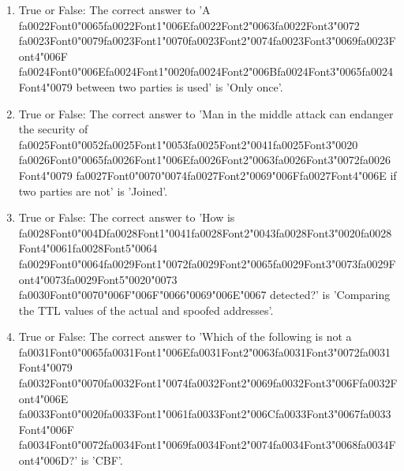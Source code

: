 \documentclass[12pt]{article}
\begin{document}
\begin{enumerate}[label=\arabic*.]
\item True or False: The correct answer to 'A {\csname fa0022Font0\endcsname\char"0065}{\csname fa0022Font1\endcsname\char"006E}{\csname fa0022Font2\endcsname\char"0063}{\csname fa0022Font3\endcsname\char"0072} {\csname fa0023Font0\endcsname\char"0079}{\csname fa0023Font1\endcsname\char"0070}{\csname fa0023Font2\endcsname\char"0074}{\csname fa0023Font3\endcsname\char"0069}{\csname fa0023Font4\endcsname\char"006F} {\csname fa0024Font0\endcsname\char"006E}{\csname fa0024Font1\endcsname\char"0020}{\csname fa0024Font2\endcsname\char"006B}{\csname fa0024Font3\endcsname\char"0065}{\csname fa0024Font4\endcsname\char"0079} between two parties is used' is 'Only once'.
\item True or False: The correct answer to 'Man in the middle attack can endanger the security of {\csname fa0025Font0\endcsname\char"0052}{\csname fa0025Font1\endcsname\char"0053}{\csname fa0025Font2\endcsname\char"0041}{\csname fa0025Font3\endcsname\char"0020} {\csname fa0026Font0\endcsname\char"0065}{\csname fa0026Font1\endcsname\char"006E}{\csname fa0026Font2\endcsname\char"0063}{\csname fa0026Font3\endcsname\char"0072}{\csname fa0026Font4\endcsname\char"0079} {\csname fa0027Font0\endcsname\char"0070}{\char"0074}{\csname fa0027Font2\endcsname\char"0069}{\char"006F}{\csname fa0027Font4\endcsname\char"006E} if two parties are not' is 'Joined'.
\item True or False: The correct answer to 'How is {\csname fa0028Font0\endcsname\char"004D}{\csname fa0028Font1\endcsname\char"0041}{\csname fa0028Font2\endcsname\char"0043}{\csname fa0028Font3\endcsname\char"0020}{\csname fa0028Font4\endcsname\char"0061}{\csname fa0028Font5\endcsname\char"0064} {\csname fa0029Font0\endcsname\char"0064}{\csname fa0029Font1\endcsname\char"0072}{\csname fa0029Font2\endcsname\char"0065}{\csname fa0029Font3\endcsname\char"0073}{\csname fa0029Font4\endcsname\char"0073}{\csname fa0029Font5\endcsname\char"0020}{\char"0073} {\csname fa0030Font0\endcsname\char"0070}{\char"006F}{\char"006F}{\char"0066}{\char"0069}{\char"006E}{\char"0067} detected?' is 'Comparing the TTL values of the actual and spoofed addresses'.
\item True or False: The correct answer to 'Which of the following is not a {\csname fa0031Font0\endcsname\char"0065}{\csname fa0031Font1\endcsname\char"006E}{\csname fa0031Font2\endcsname\char"0063}{\csname fa0031Font3\endcsname\char"0072}{\csname fa0031Font4\endcsname\char"0079} {\csname fa0032Font0\endcsname\char"0070}{\csname fa0032Font1\endcsname\char"0074}{\csname fa0032Font2\endcsname\char"0069}{\csname fa0032Font3\endcsname\char"006F}{\csname fa0032Font4\endcsname\char"006E} {\csname fa0033Font0\endcsname\char"0020}{\csname fa0033Font1\endcsname\char"0061}{\csname fa0033Font2\endcsname\char"006C}{\csname fa0033Font3\endcsname\char"0067}{\csname fa0033Font4\endcsname\char"006F} {\csname fa0034Font0\endcsname\char"0072}{\csname fa0034Font1\endcsname\char"0069}{\csname fa0034Font2\endcsname\char"0074}{\csname fa0034Font3\endcsname\char"0068}{\csname fa0034Font4\endcsname\char"006D}?' is 'CBF'.

\end{enumerate}
\end{document}
